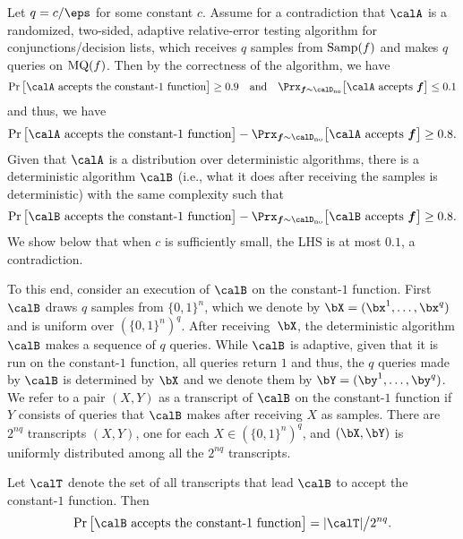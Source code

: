 \documentclass[11pt]{article}
\theoremstyle{definition}
\begin{document}
Let $q=c/\eps$ for some constant $c$. 
Assume for a contradiction that $\calA$ is a randomized, two-sided, adaptive relative-error testing algorithm
for conjunctions\hspace{0.1cm}/\hspace{0.1cm}decision lists, which receives $q$ samples from $\mathrm{Samp}(f)$ and makes $q$ queries on $\mathrm{MQ}(f)$. Then by the correctness of the algorithm, we have
\begin{align*}
\Pr\big[\text{$\calA$ accepts the constant-$1$ function}\big]\ge 0.9\quad\text{and}\quad
\Prx_{\bff\sim \Dno} \big[\text{$\calA$ accepts
  $\bff$}\big]\le 0.1
\end{align*}
and thus, we have 
$$
\Pr\big[\text{$\calA$ accepts the constant-$1$ function}\big]-
\Prx_{\bff\sim \Dno} \big[\text{$\calA$ accepts
  $\bff$}\big]\ge 0.8.
$$
Given that $\calA$ is a distribution
  over deterministic algorithms, there is
  a deterministic algorithm $\calB$ (i.e., what it does after receiving the samples is deterministic) with the 
  same complexity such that 
$$
\Pr\big[\text{$\calB$ accepts the constant-$1$ function}\big]-
\Prx_{\bff\sim \Dno} \big[\text{$\calB$ accepts
  $\bff$}\big]\ge 0.8.
$$
We show below that when $c$ is sufficiently small, 
  the LHS is at most $0.1$, a contradiction.

To this end, consider an execution of $\calB$ on
  the constant-$1$ function.
First $\calB$ draws $q$ samples from $\{0,1\}^n$,
  which we denote by $\bX=(\bx^1,\ldots,\bx^q)$ and is 
  uniform over $(\{0,1\}^n)^q$.
After receiving~$\bX$, the deterministic algorithm $\calB$ makes a sequence of $q$ queries. While $\calB$ is adaptive, given that it is run on the constant-$1$ function, all queries return $1$ and thus, the $q$ queries made by $\calB$ is determined by $\bX$ and we denote them by $\bY=(\by^1,\ldots,\by^q)$.
We refer to a pair $(X,Y)$ as a transcript of $\calB$
  on the constant-$1$ function if $Y$ consists of 
  queries that $\calB$ makes after receiving $X$ as samples.
There are $2^{nq}$ transcripts $(X,Y)$, one for each
  $X\in (\{0,1\}^n)^q$, and $(\bX,\bY)$ is uniformly distributed among all the $2^{nq}$ transcripts.
  
Let $\calT$ denote the set of all transcripts that lead $\calB$ to accept the constant-$1$ function. 
Then 
\begin{equation}\label{eq:hehe99}
\Pr\big[\text{$\calB$ accepts the constant-$1$ function}\big]=|\calT|\big/2^{nq}.
\end{equation}
\end{document}
